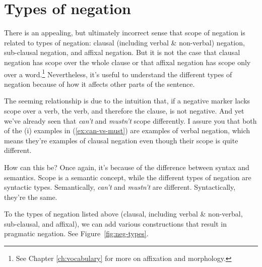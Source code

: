 \section{Types of negation} \label{sec:types-of-negation}

There is an appealing, but ultimately incorrect sense that scope of negation is related to types of negation: clausal (including verbal \& non-verbal) negation, sub-clausal negation, and affixal negation. But it is not the case that clausal negation has scope over the whole clause or that affixal negation has scope only over a word.\footnote{See Chapter \ref{ch:vocabulary} for more on affixation and morphology.} Nevertheless, it's useful to understand the different types of negation because of how it affects other parts of the sentence.

The seeming relationship is due to the intuition that, if a negative marker lacks scope over a verb, the verb, and therefore the clause, is not negative. And yet we've already seen that \textit{can't} and \textit{mustn't} scope differently. I assure you that both of the (i) examples in (\ref{ex:can-vs-must}) are examples of verbal negation, which means they're examples of clausal negation even though their scope is quite different.

How can this be? Once again, it's because of the difference between syntax and semantics. Scope is a semantic concept, while the different types of negation are syntactic types. Semantically, \textit{can't} and \textit{mustn't} are different. Syntactically, they're the same.

To the types of negation listed above (clausal, including verbal \& non-verbal, sub-clausal, and affixal), we can add various constructions that result in pragmatic negation. See Figure~\ref{fig:neg-types}.

